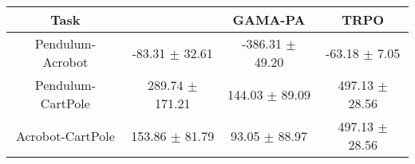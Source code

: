 
%

\begin{tabular}{cccc}
  \toprule
  \textbf{Task}     & \textbf{\DAIL{}}    & \textbf{GAMA-PA\cite{DAIL_Model_DAIL}} & \textbf{TRPO} \cite{RL_TRPO} \\
  \midrule
  Pendulum-Acrobot  & -83.31 $\pm$  32.61 & -386.31 $\pm$ 49.20                    & -63.18 $\pm$  7.05           \\
  Pendulum-CartPole & 289.74 $\pm$ 171.21 & 144.03 $\pm$ 89.09                     & 497.13 $\pm$ 28.56           \\
  Acrobot-CartPole  & 153.86 $\pm$  81.79 & 93.05 $\pm$ 88.97                      & 497.13 $\pm$ 28.56           \\
  \bottomrule
\end{tabular}
